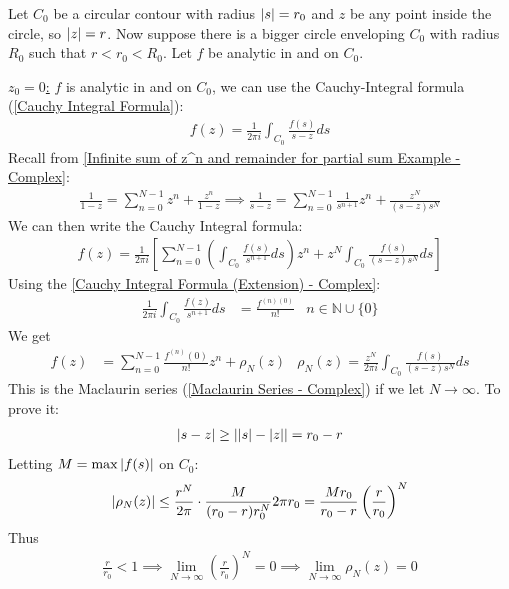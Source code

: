 \documentclass[12pt, english]{book}
\makeatletter
\renewenvironment{proof}[1][\proofname]{\par
	\pushQED{\qed}%
	\normalfont \topsep6\p@\@plus6\p@\relax
	\list{}{%
		\settowidth{\leftmargin}{\itshape\proofname:\hskip\labelsep}%
		\setlength{\labelwidth}{0pt}%
		\setlength{\itemindent}{-\leftmargin}%
		}%
	\item[\hskip\labelsep\itshape#1\@addpunct{:}]\ignorespaces
	}{\popQED\endlist\@endpefalse}
\makeatother
\begin{document}
	\begin{proof}
		Let \(C_0\) be a circular contour with radius \(\abs{s} = r_0\) and \(z\) be any point inside the circle, so \(\abs{z} = r\). Now suppose there is a bigger circle enveloping \(C_0\) with radius \(R_0\) such that \(r < r_0 < R_0\). Let \(f\) be analytic in and on \(C_0\).
		
		\underline{\(z_0 = 0\):} \newline
		\(f\) is analytic in and on \(C_0\), we can use the Cauchy-Integral formula (\cref{Cauchy Integral Formula}):
		\begin{align*}
			f(z) = \frac{1}{2\pi i} \int_{C_0} \frac{f(s)}{s-z} ds
		\end{align*}
		Recall from \cref{Infinite sum of z^n and remainder for partial sum Example - Complex}:
		\begin{align*}
			\frac{1}{1-z} = \sum_{n=0}^{N-1} z^n + \frac{z^n}{1-z}
			\implies \frac{1}{s-z} = \sum_{n=0}^{N-1} \frac{1}{s^{n+1}} z^n + \frac{z^N}{(s-z)s^N}
		\end{align*}
		We can then write the Cauchy Integral formula:
		\begin{align*}
			f(z) = \frac{1}{2\pi i} \left[
			\sum_{n=0}^{N-1} \left(\int_{C_0} \frac{f(s)}{s^{n+1}} ds \right) z^n + z^N \int_{C_0} \frac{f(s)}{(s-z)s^N} ds
			\right]
		\end{align*}
		Using the \cref{Cauchy Integral Formula (Extension) - Complex}:
		\begin{align*}
			\frac{1}{2\pi i} \int_{C_0} \frac{f(z)}{s^{n+1}} ds &= \frac{f^{(n)(0)}}{n!}
			& n \in \mathbb{N} \cup \{0\}
		\end{align*}
		We get 
		\begin{align*}
			f(z) &= \sum_{n=0}^{N-1} \frac{f^{(n)}(0)}{n!} z^n + \rho_N (z) &
			\rho_N(z) = \frac{z^N}{2\pi i} \int_{C_0} \frac{f(s)}{(s-z)s^N} ds
		\end{align*}
		This is the Maclaurin series (\cref{Maclaurin Series - Complex}) if we let \(N \rightarrow \infty\). To prove it: 
		\begin{align*}
			\abs{s-z} \geq \abs{\abs{s} - \abs{z}} = r_0 - r
		\end{align*}
		Letting \(M = \max\abs{f(s)}\) on \(C_0\):
		\begin{align*}
			\abs{\rho_N(z)} \leq \frac{r^N}{2\pi} \cdot \frac{M}{(r_0 - r)r_0^N} 2\pi r_0 = \frac{Mr_0}{r_0 - r} \left(\frac{r}{r_0}\right)^N
		\end{align*}
		Thus
		\begin{align*}
			\frac{r}{r_0} < 1 
			\implies \lim_{N\rightarrow \infty} \left(\frac{r}{r_0}\right)^N = 0 
			\implies \lim_{N \rightarrow \infty} \rho_N (z) = 0
		\end{align*}
		

\end{proof}
\end{document}

